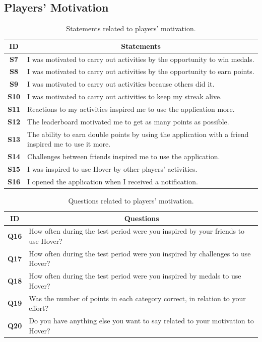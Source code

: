 \subsection*{Players' Motivation}
\begin{table}[H]
    \centering
    \begin{tabularx}{\textwidth}{|c|X|}
        \hline
        \textbf{ID} & \multicolumn{1}{c|}{\textbf{Statements}} \\ \hline
        \textbf{S7} & I was motivated to carry out activities by the opportunity to win medals. \\
        \textbf{S8} & I was motivated to carry out activities by the opportunity to earn points. \\
        \textbf{S9} & I was motivated to carry out activities because others did it. \\
        \textbf{S10} & I was motivated to carry out activities to keep my streak alive. \\
        \textbf{S11} & Reactions to my activities inspired me to use the application more. \\
        \textbf{S12} & The leaderboard motivated me to get as many points as possible. \\
        \textbf{S13} & The ability to earn double points by using the application with a friend inspired me to use it more. \\
        \textbf{S14} & Challenges between friends inspired me to use the application. \\
        \textbf{S15} & I was inspired to use Hover by other players' activities. \\
        \textbf{S16} & I opened the application when I received a notification. \\ \hline
    \end{tabularx}
    \caption{Statements related to players' motivation.}
    \label{tab:appendix_player_motivation_statements}
\end{table}

\begin{table}[H]
    \centering
    \begin{tabularx}{\textwidth}{|c|X|}
        \hline
        \textbf{ID} & \multicolumn{1}{c|}{\textbf{Questions}} \\ \hline
        \textbf{Q16} & How often during the test period were you inspired by your friends to use Hover? \\
        \textbf{Q17} & How often during the test period were you inspired by challenges to use Hover? \\
        \textbf{Q18} & How often during the test period were you inspired by medals to use Hover? \\
        \textbf{Q19} & Was the number of points in each category correct, in relation to your effort? \\
        \textbf{Q20} & Do you have anything else you want to say related to your motivation to Hover? \\ \hline
    \end{tabularx}
    \caption{Questions related to players' motivation.}
    \label{tab:appendix_player_motivation_questions}
\end{table}

